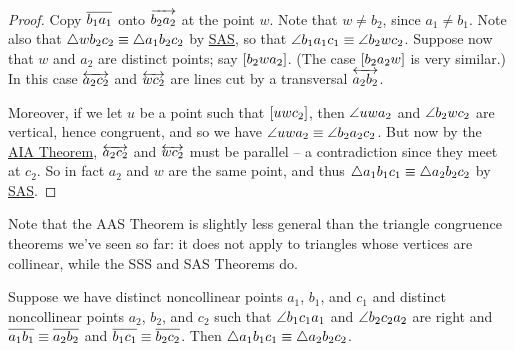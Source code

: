 \begin{proof}
Copy \(\overline{b_1a_1}\) onto \(\overrightarrow{b_2a_2}\) at the point \(w\).
Note that \(w \neq b_2\), since \(a_1 \neq b_1\).
Note also that \(\bigtriangleup{wb_2c_2} \equiv \bigtriangleup{a_1b_2c_2}\) by \hyperref[prop:sas-theorem]{SAS}, so that \(\angle{b_1a_1c_1} \equiv \angle{b_2wc_2}\).
Suppose now that \(w\) and \(a_2\) are distinct points; say \([ b_2 w a_2 ]\).
(The case \([ b_2 a_2 w ]\) is very similar.)
In this case \(\overleftrightarrow{a_2c_2}\) and \(\overleftrightarrow{wc_2}\) are lines cut by a transversal \(\overleftrightarrow{a_2b_2}\).

\begin{center}
\end{center}

Moreover, if we let \(u\) be a point such that \([ u w c_2 ]\), then \(\angle{uwa_2}\) and \(\angle{b_2wc_2}\) are vertical, hence congruent, and so we have \(\angle{uwa_2} \equiv \angle{b_2a_2c_2}\).
But now by the \hyperref[prop:aia-theorem]{AIA Theorem}, \(\overleftrightarrow{a_2c_2}\) and \(\overleftrightarrow{wc_2}\) must be parallel -- a contradiction since they meet at \(c_2\).
So in fact \(a_2\) and \(w\) are the same point, and thus \(\bigtriangleup{a_1b_1c_1} \equiv \bigtriangleup{a_2b_2c_2}\) by \hyperref[prop:sas-theorem]{SAS}.
\end{proof}

Note that the AAS Theorem is slightly less general than the triangle congruence theorems we've seen so far: it does not apply to triangles whose vertices are collinear, while the SSS and SAS Theorems do.

\begin{prop}[HL Theorem]
Suppose we have distinct noncollinear points \(a_1\), \(b_1\), and \(c_1\) and distinct noncollinear points \(a_2\), \(b_2\), and \(c_2\) such that \(\angle{b_1c_1a_1}\) and \(\angle{b_2c_2a_2}\) are right and \(\overline{a_1b_1} \equiv \overline{a_2b_2}\) and \(\overline{b_1c_1} \equiv \overline{b_2c_2}\).
Then \(\bigtriangleup{a_1b_1c_1} \equiv \bigtriangleup{a_2b_2c_2}\).
\end{prop}

